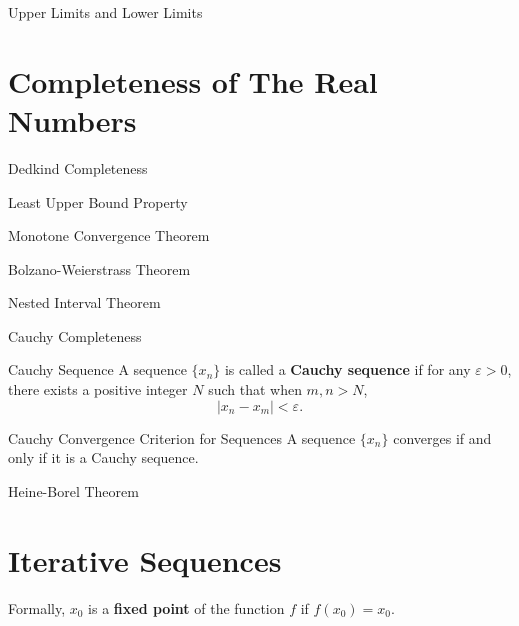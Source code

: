 \documentclass[11pt]{../../TexTemplate/elegantbook}
\begin{document}
\begin{leftbarTitle}{Upper Limits and Lower Limits}\end{leftbarTitle}


\section{Completeness of The Real Numbers}
\begin{leftbarTitle}{Dedkind Completeness}\end{leftbarTitle}

\begin{leftbarTitle}{Least Upper Bound Property}\end{leftbarTitle}

\begin{leftbarTitle}{Monotone Convergence Theorem}\end{leftbarTitle}

\begin{leftbarTitle}{Bolzano-Weierstrass Theorem}\end{leftbarTitle}

\begin{leftbarTitle}{Nested Interval Theorem}\end{leftbarTitle}

\begin{leftbarTitle}{Cauchy Completeness}\end{leftbarTitle}
\begin{definition}{Cauchy Sequence}
    A sequence \(\{x_n\}\) is called a \textbf{Cauchy sequence} if for any \(\varepsilon > 0\), 
    there exists a positive integer \(N\) such that when \(m,n > N\), 
    \[
        \left|x_n - x_m\right| < \varepsilon.
    \]
\end{definition}

\begin{theorem}{Cauchy Convergence Criterion for Sequences}\label{thm:Cauchy Convergence Criterion for Sequences}
    A sequence \(\{x_n\}\) converges if and only if it is a Cauchy sequence.
\end{theorem}


\begin{leftbarTitle}{Heine-Borel Theorem}\end{leftbarTitle}

\section{Iterative Sequences}
Formally, \(x_{0}\) is a \textbf{fixed point} of the function \(f\) if \(f(x_{0}) = x_{0}\).
\end{document}
